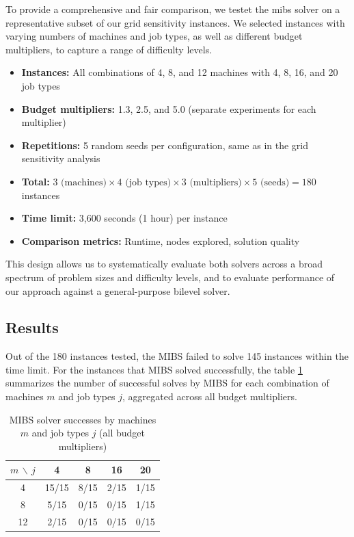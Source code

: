 To provide a comprehensive and fair comparison, we testet the mibs solver on a representative subset of our grid sensitivity instances. We selected instances with varying numbers of machines and job types, as well as different budget multipliers, to capture a range of difficulty levels.
\begin{itemize}
    \item \textbf{Instances:} All combinations of 4, 8, and 12 machines with 4, 8, 16, and 20 job types
    \item \textbf{Budget multipliers:} 1.3, 2.5, and 5.0 (separate experiments for each multiplier)
    \item \textbf{Repetitions:} 5 random seeds per configuration, same as in the grid sensitivity analysis
    \item \textbf{Total:} $3 \text{ (machines)} \times 4 \text{ (job types)} \times 3 \text{ (multipliers)} \times 5 \text{ (seeds)} = 180$ instances
    \item \textbf{Time limit:} 3,600 seconds (1 hour) per instance
    \item \textbf{Comparison metrics:} Runtime, nodes explored, solution quality
\end{itemize}
This design allows us to systematically evaluate both solvers across a broad spectrum of problem sizes and difficulty levels, and to evaluate performance of our approach against a general-purpose bilevel solver.

\subsection{Results}

Out of the 180 instances tested, the MIBS failed to solve 145 instances within the time limit. 
For the instances that MIBS solved successfully, the table \ref{tab:mibs-success-grid} summarizes the number of successful solves by MIBS for each combination of machines $m$ and job types $j$, aggregated across all budget multipliers.
\begin{table}[htbp]
\centering
\caption{MIBS solver successes by machines $m$ and job types $j$ (all budget multipliers)}
\label{tab:mibs-success-grid}
\begin{tabular}{c|cccc}
\toprule
$m$ $\backslash$ $j$ & 4 & 8 & 16 & 20 \\
\midrule
4 & 15/15 & 8/15 & 2/15 & 1/15 \\
8 & 5/15 & 0/15 & 0/15 & 1/15 \\
12 & 2/15 & 0/15 & 0/15 & 0/15 \\
\bottomrule
\end{tabular}
\end{table}

